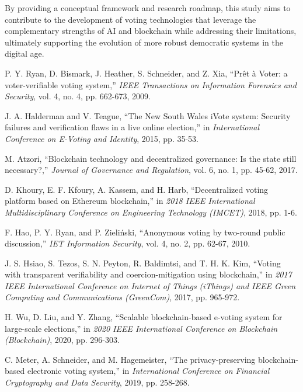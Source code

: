 \documentclass[conference]{IEEEtran}
\begin{document}
By providing a conceptual framework and research roadmap, this study aims to contribute to the development of voting technologies that leverage the complementary strengths of AI and blockchain while addressing their limitations, ultimately supporting the evolution of more robust democratic systems in the digital age.

\begin{thebibliography}{20}

 P. Y. Ryan, D. Bismark, J. Heather, S. Schneider, and Z. Xia, ``Prêt à Voter: a voter-verifiable voting system,'' \textit{IEEE Transactions on Information Forensics and Security}, vol. 4, no. 4, pp. 662-673, 2009.

 J. A. Halderman and V. Teague, ``The New South Wales iVote system: Security failures and verification flaws in a live online election,'' in \textit{International Conference on E-Voting and Identity}, 2015, pp. 35-53.

 M. Atzori, ``Blockchain technology and decentralized governance: Is the state still necessary?,'' \textit{Journal of Governance and Regulation}, vol. 6, no. 1, pp. 45-62, 2017.

 D. Khoury, E. F. Kfoury, A. Kassem, and H. Harb, ``Decentralized voting platform based on Ethereum blockchain,'' in \textit{2018 IEEE International Multidisciplinary Conference on Engineering Technology (IMCET)}, 2018, pp. 1-6.

 F. Hao, P. Y. Ryan, and P. Zieliński, ``Anonymous voting by two-round public discussion,'' \textit{IET Information Security}, vol. 4, no. 2, pp. 62-67, 2010.

 J. S. Hsiao, S. Tezos, S. N. Peyton, R. Baldimtsi, and T. H. K. Kim, ``Voting with transparent verifiability and coercion-mitigation using blockchain,'' in \textit{2017 IEEE International Conference on Internet of Things (iThings) and IEEE Green Computing and Communications (GreenCom)}, 2017, pp. 965-972.

 H. Wu, D. Liu, and Y. Zhang, ``Scalable blockchain-based e-voting system for large-scale elections,'' in \textit{2020 IEEE International Conference on Blockchain (Blockchain)}, 2020, pp. 296-303.

 C. Meter, A. Schneider, and M. Hagemeister, ``The privacy-preserving blockchain-based electronic voting system,'' in \textit{International Conference on Financial Cryptography and Data Security}, 2019, pp. 258-268.


\end{thebibliography}
\end{document}
